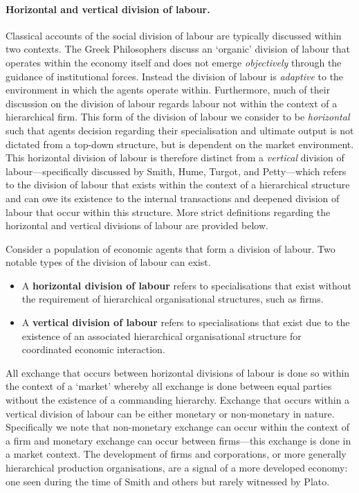 \paragraph{Horizontal and vertical division of labour.}

Classical accounts of the social division of labour are typically discussed within two contexts. The Greek Philosophers discuss an `organic' division of labour that operates within the economy itself and does not emerge \emph{objectively} through the guidance of institutional forces. Instead the division of labour is \emph{adaptive} to the environment in which the agents operate within. Furthermore, much of their discussion on the division of labour regards labour not within the context of a hierarchical firm. This form of the division of labour we consider to be \emph{horizontal} such that agents decision regarding their specialisation and ultimate output is not dictated from a top-down structure, but is dependent on the market environment. This horizontal division of labour is therefore distinct from a \emph{vertical} division of labour---specifically discussed by Smith, Hume, Turgot, and Petty---which refers to the division of labour that exists within the context of a hierarchical structure and can owe its existence to the internal transactions and deepened division of labour that occur within this structure. More strict definitions regarding the horizontal and vertical divisions of labour are provided below.

\begin{definition}
Consider a population of economic agents that form a division of labour. Two notable types of the division of labour can exist.
\begin{itemize}
\item A \textbf{horizontal division of labour} refers to specialisations that exist without the requirement of hierarchical organisational structures, such as firms.
\item A \textbf{vertical division of labour} refers to specialisations that exist due to the existence of an associated hierarchical organisational structure for coordinated economic interaction.
\end{itemize}
\end{definition}

All exchange that occurs between horizontal divisions of labour is done so within the context of a `market' whereby all exchange is done between equal parties without the existence of a commanding hierarchy. Exchange that occurs within a vertical division of labour can be either monetary or non-monetary in nature. Specifically we note that non-monetary exchange can occur within the context of a firm and monetary exchange can occur between firms---this exchange is done in a market context. The development of firms and corporations, or more generally hierarchical production organisations, are a signal of a more developed economy: one seen during the time of Smith and others but rarely witnessed by Plato.

